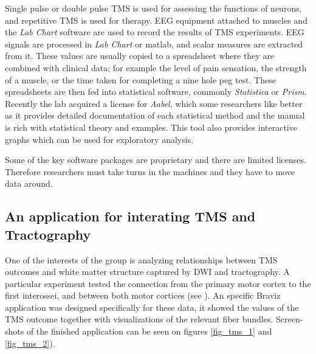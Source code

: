 Single pulse or double pulse TMS is used for assessing the functions of neurons, and repetitive TMS is used for therapy. EEG equipment attached to muscles and the \emph{Lab Chart} software are used to record the results of TMS experiments. EEG signals are processed in \emph{Lab Chart} or matlab, and scalar measures are extracted from it. These values are usually  copied to a spreadsheet where they are combined with clinical data; for example the level of pain sensation, the strength of a muscle, or the time taken for completing a nine hole peg test. These spreadsheets are then fed into statistical software, commonly \emph{Statistica} or \emph{Prism}. Recently the lab acquired a license for \emph{Aabel}, which some researchers like better as it provides detailed documentation of each statistical method and the manual is  rich with statistical theory and examples. This tool also provides interactive graphs which can be used for exploratory analysis. 

Some of the key software packages are proprietary and there are limited licenses. Therefore researchers must take turns in the machines and they have to move data around.



 


\subsection{An application for interating TMS and Tractography}

One of the interests of the group is analyzing relationships between TMS outcomes and white matter structure captured by DWI and tractography. A particular experiment tested the connection from the primary motor cortex to the first interossei, and between both motor cortices (see \autocite{schneider_cerebral_2012}). An specific Braviz application was designed specifically for these data, it showed the values of the TMS outcome together with visualizations of the relevant fiber bundles. Screen-shots of the finished application can be seen on figures \ref{fig_tms_1} and \ref{fig_tms_2}). 

